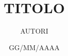 \documentclass[a4paper, 10pt]{article}
\title{TITOLO}
\author{
    AUTORI
}
\date{GG/MM/AAAA}
\begin{document}
\maketitle

\begin{abstract}
\end{abstract}








\end{document}
